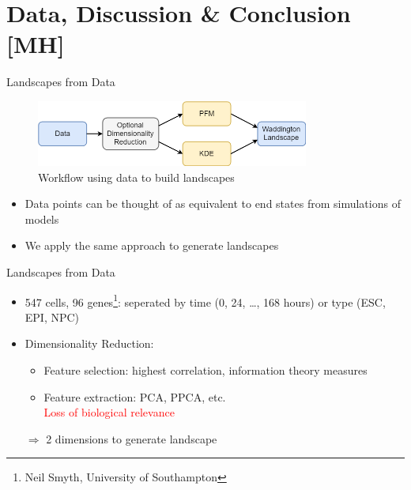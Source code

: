 \documentclass{beamer}
\begin{document}
\section{Data, Discussion \& Conclusion [MH]}

\begin{frame}{Landscapes from Data}
\begin{figure}
\centering
\includegraphics[width=0.8\textwidth]{MHworkflow.png}
\caption{Workflow using data to build landscapes}
\end{figure}
\begin{itemize}
\item Data points can be thought of as equivalent to end states from simulations of models
\item We apply the same approach to generate landscapes
\end{itemize}
\end{frame}


\begin{frame}{Landscapes from Data}

\begin{itemize}
\item 547 cells, 96 genes\footnote{Neil Smyth, University of Southampton}: seperated by time (0, 24, \ldots, 168 hours) or type (ESC, EPI, NPC)
\item Dimensionality Reduction: \begin{itemize}
\item Feature selection: highest correlation, information theory measures
\item Feature extraction: PCA, PPCA, etc. \\ \textcolor{red}{Loss of biological relevance}
\end{itemize}
$\Rightarrow$ 2 dimensions to generate landscape
\end{itemize}
\end{frame}
\end{document}
